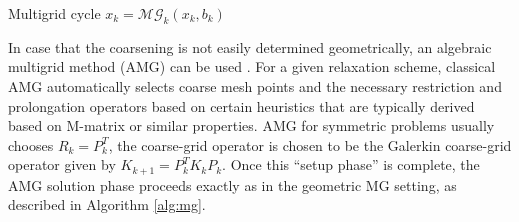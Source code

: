 \begin{algorithm}
  \caption{Multigrid cycle $x_k = \mathcal{MG}_k(x_k,b_k)$}
  \label{alg:mg}
  \begin{algorithmic}
  \ELSE
  \ENDIF
  \end{algorithmic}
\end{algorithm}

In case that the coarsening is not easily determined geometrically, an
algebraic multigrid method (AMG) can be
used \cite{ABrandt_SFMcCormick_JWRuge_1984a, JWRuge_KStuben_1987a,
KStuben_2001a}. For a given relaxation scheme, classical AMG
automatically selects coarse mesh points and the necessary restriction
and prolongation operators based on certain heuristics that are
typically derived based on M-matrix or similar properties. AMG for
symmetric problems usually chooses $R_k = P_k^T$, the coarse-grid
operator is chosen to be the Galerkin coarse-grid operator given by
$K_{k+1} = P_k^T K_k P_k$.  Once this ``setup phase'' is complete, the
AMG solution phase proceeds exactly as in the geometric MG setting, as
described in Algorithm \ref{alg:mg}.

